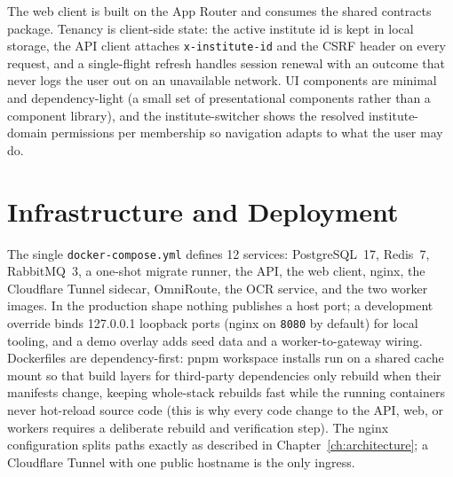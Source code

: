 \noindent The web client is built on the App Router and consumes the shared
contracts package. Tenancy is client-side state: the active institute id is
kept in local storage, the API client attaches \texttt{x-institute-id} and the
CSRF header on every request, and a single-flight refresh handles session
renewal with an outcome that never logs the user out on an unavailable
network. UI components are minimal and dependency-light (a small set of
presentational components rather than a component library), and the
institute-switcher shows the resolved institute-domain permissions per
membership so navigation adapts to what the user may do.

\section{Infrastructure and Deployment}

\noindent The single \texttt{docker-compose.yml} defines 12 services:
PostgreSQL~17, Redis~7, RabbitMQ~3, a one-shot migrate runner, the API, the
web client, nginx, the Cloudflare Tunnel sidecar, OmniRoute, the OCR service,
and the two worker images. In the production shape nothing publishes a host
port; a development override binds 127.0.0.1 loopback ports (nginx on
\texttt{8080} by default) for local tooling, and a demo overlay adds seed data
and a worker-to-gateway wiring. Dockerfiles are dependency-first: pnpm
workspace installs run on a shared cache mount so that build layers for
third-party dependencies only rebuild when their manifests change, keeping
whole-stack rebuilds fast while the running containers never hot-reload source
code (this is why every code change to the API, web, or workers requires a
deliberate rebuild and verification step). The nginx configuration splits
paths exactly as described in Chapter~\ref{ch:architecture}; a Cloudflare
Tunnel with one public hostname is the only ingress.